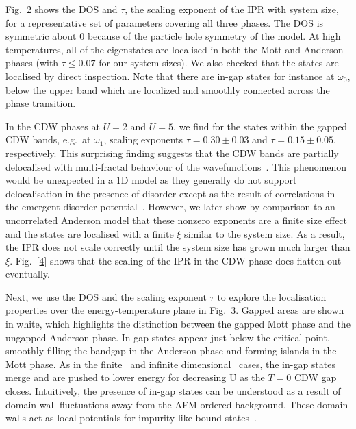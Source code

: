 Fig.~\protect\hyperlink{fig:indiv_IPR}{2} shows the DOS and \(\tau\), the scaling exponent of the IPR with system size, for a representative set of parameters covering all three phases. The DOS is symmetric about \(0\) because of the particle hole symmetry of the model. At high temperatures, all of the eigenstates are localised in both the Mott and Anderson phases (with \(\tau \leq 0.07\) for our system sizes). We also checked that the states are localised by direct inspection. Note that there are in-gap states for instance at \(\omega_0\), below the upper band which are localized and smoothly connected across the phase transition.

In the CDW phases at \(U=2\) and \(U=5\), we find for the states within the gapped CDW bands, e.g.~at \(\omega_1\), scaling exponents \(\tau = 0.30\pm0.03\) and \(\tau = 0.15\pm0.05\), respectively. This surprising finding suggests that the CDW bands are partially delocalised with multi-fractal behaviour of the wavefunctions~\autocite{eversAndersonTransitions2008}. This phenomenon would be unexpected in a 1D model as they generally do not support delocalisation in the presence of disorder except as the result of correlations in the emergent disorder potential~\autocite{croyAndersonLocalization1D2011,goldshteinPurePointSpectrum1977}. However, we later show by comparison to an uncorrelated Anderson model that these nonzero exponents are a finite size effect and the states are localised with a finite \(\xi\) similar to the system size. As a result, the IPR does not scale correctly until the system size has grown much larger than \(\xi\). Fig.~{[}\protect\hyperlink{fig:indiv_IPR_disorder}{4}{]} shows that the scaling of the IPR in the CDW phase does flatten out eventually.

Next, we use the DOS and the scaling exponent \(\tau\) to explore the localisation properties over the energy-temperature plane in Fig.~\protect\hyperlink{fig:band_opening}{3}. Gapped areas are shown in white, which highlights the distinction between the gapped Mott phase and the ungapped Anderson phase. In-gap states appear just below the critical point, smoothly filling the bandgap in the Anderson phase and forming islands in the Mott phase. As in the finite~\autocite{zondaGaplessRegimeCharge2019} and infinite dimensional~\autocite{hassanSpectralPropertiesChargedensitywave2007} cases, the in-gap states merge and are pushed to lower energy for decreasing U as the \(T=0\) CDW gap closes. Intuitively, the presence of in-gap states can be understood as a result of domain wall fluctuations away from the AFM ordered background. These domain walls act as local potentials for impurity-like bound states~\autocite{zondaGaplessRegimeCharge2019}.

